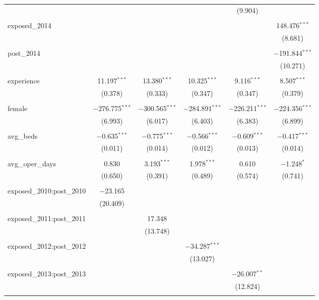 \begin{table}[!htbp]
\begin{adjustbox}{width=\textwidth}
\begin{tabular}{@{\extracolsep{5pt}}lccccc}
  &  &  &  & (9.904) &  \\ 
  & & & & & \\ 
 exposed\_2014 &  &  &  &  & 148.476$^{***}$ \\ 
  &  &  &  &  & (8.681) \\ 
  & & & & & \\ 
 post\_2014 &  &  &  &  & $-$191.844$^{***}$ \\ 
  &  &  &  &  & (10.271) \\ 
  & & & & & \\ 
 experience & 11.197$^{***}$ & 13.380$^{***}$ & 10.325$^{***}$ & 9.116$^{***}$ & 8.507$^{***}$ \\ 
  & (0.378) & (0.333) & (0.347) & (0.347) & (0.379) \\ 
  & & & & & \\ 
 female & $-$276.775$^{***}$ & $-$300.565$^{***}$ & $-$284.891$^{***}$ & $-$226.211$^{***}$ & $-$224.356$^{***}$ \\ 
  & (6.993) & (6.017) & (6.403) & (6.383) & (6.899) \\ 
  & & & & & \\ 
 avg\_beds & $-$0.635$^{***}$ & $-$0.775$^{***}$ & $-$0.566$^{***}$ & $-$0.609$^{***}$ & $-$0.417$^{***}$ \\ 
  & (0.011) & (0.014) & (0.012) & (0.013) & (0.014) \\ 
  & & & & & \\ 
 avg\_oper\_days & 0.830 & 3.193$^{***}$ & 1.978$^{***}$ & 0.610 & $-$1.248$^{*}$ \\ 
  & (0.650) & (0.391) & (0.489) & (0.574) & (0.741) \\ 
  & & & & & \\ 
 exposed\_2010:post\_2010 & $-$23.165 &  &  &  &  \\ 
  & (20.409) &  &  &  &  \\ 
  & & & & & \\ 
 exposed\_2011:post\_2011 &  & 17.348 &  &  &  \\ 
  &  & (13.748) &  &  &  \\ 
  & & & & & \\ 
 exposed\_2012:post\_2012 &  &  & $-$34.287$^{***}$ &  &  \\ 
  &  &  & (13.027) &  &  \\ 
  & & & & & \\ 
 exposed\_2013:post\_2013 &  &  &  & $-$26.007$^{**}$ &  \\ 
  &  &  &  & (12.824) &  \\ 
  & & & & & \\ 

\end{tabular}
\end{adjustbox}
\end{table}
